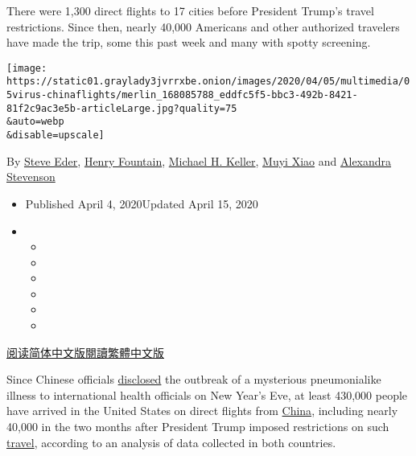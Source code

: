 There were 1,300 direct flights to 17 cities before President Trump's
travel restrictions. Since then, nearly 40,000 Americans and other
authorized travelers have made the trip, some this past week and many
with spotty screening.

\texttt{[image: https://static01.graylady3jvrrxbe.onion/images/2020/04/05/multimedia/05virus-chinaflights/merlin\_168085788\_eddfc5f5-bbc3-492b-8421-81f2c9ac3e5b-articleLarge.jpg?quality=75\\\&auto=webp\\\&disable=upscale]}

By \href{https://www.nytimes3xbfgragh.onion/by/steve-eder}{Steve Eder},
\href{https://www.nytimes3xbfgragh.onion/by/henry-fountain}{Henry
Fountain},
\href{https://www.nytimes3xbfgragh.onion/by/michael-h-keller}{Michael H.
Keller}, \href{https://www.nytimes3xbfgragh.onion/by/muyi-xiao}{Muyi
Xiao} and
\href{https://www.nytimes3xbfgragh.onion/by/alexandra-stevenson}{Alexandra
Stevenson}

\begin{itemize}
\item
  Published April 4, 2020Updated April 15, 2020
\item
  \begin{itemize}
  \item
  \item
  \item
  \item
  \item
  \item
  \end{itemize}
\end{itemize}

\href{https://cn.nytimes3xbfgragh.onion/usa/20200407/coronavirus-china-travel-restrictions/}{阅读简体中文版}\href{https://cn.nytimes3xbfgragh.onion/usa/20200407/coronavirus-china-travel-restrictions/zh-hant/}{閱讀繁體中文版}

Since Chinese officials
\href{https://www.nytimes3xbfgragh.onion/2020/03/07/us/politics/trump-coronavirus.html}{disclosed}
the outbreak of a mysterious pneumonialike illness to international
health officials on New Year's Eve, at least 430,000 people have arrived
in the United States on direct flights from
\href{https://www.nytimes3xbfgragh.onion/2020/04/16/world/asia/coronavirus-china-nationalism.html}{China},
including nearly 40,000 in the two months after President Trump imposed
restrictions on such
\href{https://www.nytimes3xbfgragh.onion/2020/04/15/travel/q-and-a-coronavirus-travel.html}{travel},
according to an analysis of data collected in both countries.

